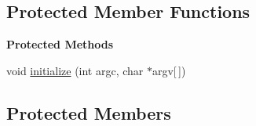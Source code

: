 \subsection*{Protected Member Functions}
\begin{Indent}\textbf{ Protected Methods}\par
\begin{DoxyCompactItemize}
\item 
void \mbox{\hyperlink{classrev_1_1_file_manager_a71446f681e447ad0193860643fabf15c}{initialize}} (int argc, char $\ast$argv\mbox{[}$\,$\mbox{]})
\end{DoxyCompactItemize}
\end{Indent}
\subsection*{Protected Members}
